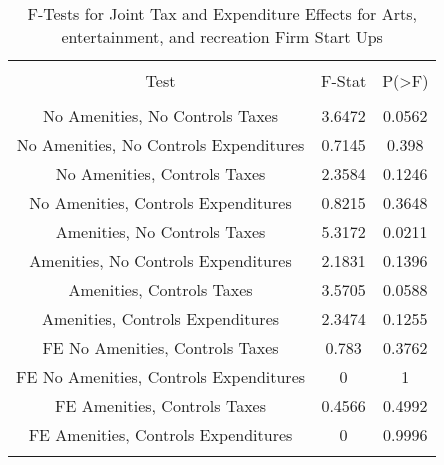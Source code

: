 
\begin{table}[!htbp] \centering 
  \caption{F-Tests for Joint Tax and Expenditure Effects for Arts, entertainment, and recreation Firm Start Ups} 
  \label{71Ftests} 
\begin{tabular}{@{\extracolsep{5pt}} ccc} 
\\[-1.8ex]\hline 
\hline \\[-1.8ex] 
Test & F-Stat & P(\textgreater F) \\ 
\hline \\[-1.8ex] 
No Amenities, No Controls Taxes & 3.6472 & 0.0562 \\ 
No Amenities, No Controls Expenditures & 0.7145 & 0.398 \\ 
No Amenities, Controls Taxes & 2.3584 & 0.1246 \\ 
No Amenities, Controls Expenditures & 0.8215 & 0.3648 \\ 
Amenities, No Controls Taxes & 5.3172 & 0.0211 \\ 
Amenities, No Controls Expenditures & 2.1831 & 0.1396 \\ 
Amenities, Controls Taxes & 3.5705 & 0.0588 \\ 
Amenities, Controls Expenditures & 2.3474 & 0.1255 \\ 
FE No Amenities, Controls Taxes & 0.783 & 0.3762 \\ 
FE No Amenities, Controls Expenditures & 0 & 1 \\ 
FE Amenities, Controls Taxes & 0.4566 & 0.4992 \\ 
FE Amenities, Controls Expenditures & 0 & 0.9996 \\ 
\hline \\[-1.8ex] 
\end{tabular} 
\end{table} 
